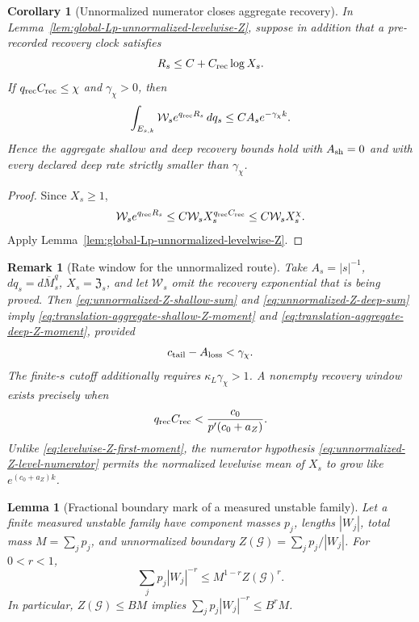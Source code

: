 \documentclass[11pt]{article}
\newtheorem{lemma}[theorem]{Lemma}
\newtheorem{corollary}[theorem]{Corollary}
\newtheorem{remark}[theorem]{Remark}
\begin{document}
\begin{corollary}[Unnormalized numerator closes aggregate recovery]
\label{cor:unnormalized-Z-closes-aggregate-recovery}
In Lemma~\ref{lem:global-Lp-unnormalized-levelwise-Z}, suppose in addition
that a pre-recorded recovery clock satisfies
\[
 R_s\le C+C_{\rm rec}\log X_s .
\]
If $q_{\rm rec}C_{\rm rec}\le\chi$ and $\gamma_\chi>0$, then
\begin{equation}
\label{eq:unnormalized-recovery-level}
 \int_{E_{s,k}}\mathcal W_se^{q_{\rm rec}R_s}\,dq_s
 \le CA_s e^{-\gamma_\chi k}.
\end{equation}
Hence the aggregate shallow and deep recovery bounds hold with
$A_{\rm sh}=0$ and with every declared deep rate strictly smaller than
$\gamma_\chi$.
\end{corollary}

\begin{proof}
Since $X_s\ge1$,
\[
 \mathcal W_se^{q_{\rm rec}R_s}
 \le C\mathcal W_sX_s^{q_{\rm rec}C_{\rm rec}}
 \le C\mathcal W_sX_s^\chi.
\]
Apply Lemma~\ref{lem:global-Lp-unnormalized-levelwise-Z}.
\end{proof}

\begin{remark}[Rate window for the unnormalized route]
\label{rem:unnormalized-Z-rate-window}
Take $A_s=|s|^{-1}$,
$dq_s=d\overline M_s^q$, $X_s=\mathfrak Z_s$, and let
$\mathcal W_s$ omit the recovery exponential that is being proved.  Then
\eqref{eq:unnormalized-Z-shallow-sum} and
\eqref{eq:unnormalized-Z-deep-sum} imply
\eqref{eq:translation-aggregate-shallow-Z-moment} and
\eqref{eq:translation-aggregate-deep-Z-moment}, provided
\[
 c_{\rm tail}-A_{\rm loss}<\gamma_\chi.
\]
The finite-$s$ cutoff additionally requires
$\kappa_L\gamma_\chi>1$.  A nonempty recovery window exists precisely when
\[
 q_{\rm rec}C_{\rm rec}
 <\frac{c_0}{p'(c_0+a_Z)}.
\]
Unlike \eqref{eq:levelwise-Z-first-moment}, the numerator hypothesis
\eqref{eq:unnormalized-Z-level-numerator} permits the normalized
levelwise mean of $X_s$ to grow like $e^{(c_0+a_Z)k}$.
\end{remark}

\begin{lemma}[Fractional boundary mark of a measured unstable family]
\label{lem:fractional-family-boundary-mark}
Let a finite measured unstable family have component masses $p_j$, lengths
$|W_j|$, total mass $M=\sum_jp_j$, and unnormalized boundary
$Z(\mathcal G)=\sum_jp_j/|W_j|$.  For $0<r<1$,
\begin{equation}
\label{eq:fractional-family-boundary-mark}
 \sum_jp_j|W_j|^{-r}
 \le M^{1-r}Z(\mathcal G)^r.
\end{equation}
In particular, $Z(\mathcal G)\le BM$ implies
$\sum_jp_j|W_j|^{-r}\le B^rM$.
\end{lemma}
\end{document}
